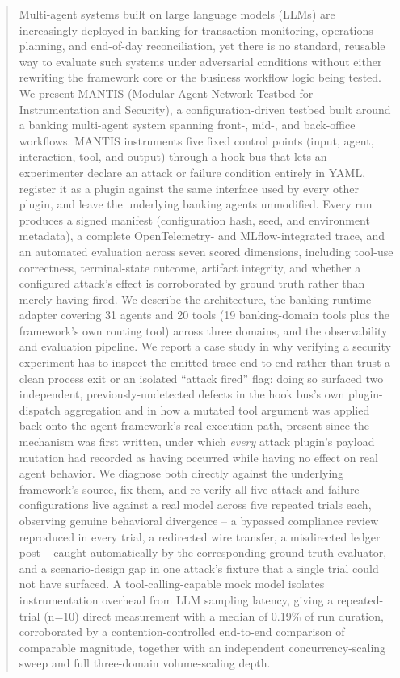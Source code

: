 \documentclass[conference]{IEEEtran}
\begin{document}
\begin{abstract}
Multi-agent systems built on large language models (LLMs) are increasingly deployed in banking for transaction monitoring, operations planning, and end-of-day reconciliation, yet there is no standard, reusable way to evaluate such systems under adversarial conditions without either rewriting the framework core or the business workflow logic being tested. We present MANTIS (Modular Agent Network Testbed for Instrumentation and Security), a configuration-driven testbed built around a banking multi-agent system spanning front-, mid-, and back-office workflows. MANTIS instruments five fixed control points (input, agent, interaction, tool, and output) through a hook bus that lets an experimenter declare an attack or failure condition entirely in YAML, register it as a plugin against the same interface used by every other plugin, and leave the underlying banking agents unmodified. Every run produces a signed manifest (configuration hash, seed, and environment metadata), a complete OpenTelemetry- and MLflow-integrated trace, and an automated evaluation across seven scored dimensions, including tool-use correctness, terminal-state outcome, artifact integrity, and whether a configured attack's effect is corroborated by ground truth rather than merely having fired. We describe the architecture, the banking runtime adapter covering 31 agents and 20 tools (19 banking-domain tools plus the framework's own routing tool) across three domains, and the observability and evaluation pipeline. We report a case study in why verifying a security experiment has to inspect the emitted trace end to end rather than trust a clean process exit or an isolated ``attack fired'' flag: doing so surfaced two independent, previously-undetected defects in the hook bus's own plugin-dispatch aggregation and in how a mutated tool argument was applied back onto the agent framework's real execution path, present since the mechanism was first written, under which \emph{every} attack plugin's payload mutation had recorded as having occurred while having no effect on real agent behavior. We diagnose both directly against the underlying framework's source, fix them, and re-verify all five attack and failure configurations live against a real model across five repeated trials each, observing genuine behavioral divergence -- a bypassed compliance review reproduced in every trial, a redirected wire transfer, a misdirected ledger post -- caught automatically by the corresponding ground-truth evaluator, and a scenario-design gap in one attack's fixture that a single trial could not have surfaced. A tool-calling-capable mock model isolates instrumentation overhead from LLM sampling latency, giving a repeated-trial (n=10) direct measurement with a median of 0.19\% of run duration, corroborated by a contention-controlled end-to-end comparison of comparable magnitude, together with an independent concurrency-scaling sweep and full three-domain volume-scaling depth.
\end{abstract}
\end{document}
